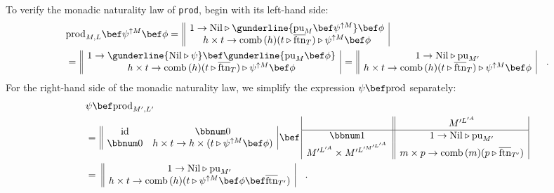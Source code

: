 To verify the monadic naturality law of \lstinline!prod!, begin with
its left-hand side:
\begin{align*}
 & \text{prod}_{M,L}\bef\psi^{\uparrow M}\bef\phi=\,\begin{array}{||c|}
1\rightarrow\text{Nil}\triangleright\gunderline{\text{pu}_{M}\bef\psi^{\uparrow M}}\bef\phi\\
h\times t\rightarrow\text{comb}\,(h)(t\triangleright\overline{\text{ftn}}_{T})\triangleright\psi^{\uparrow M}\bef\phi
\end{array}\\
 & =\,\begin{array}{||c|}
1\rightarrow\gunderline{\text{Nil}\triangleright\psi}\bef\gunderline{\text{pu}_{M}\bef\phi}\\
h\times t\rightarrow\text{comb}\,(h)(t\triangleright\overline{\text{ftn}}_{T})\triangleright\psi^{\uparrow M}\bef\phi
\end{array}\,=\,\begin{array}{||c|}
1\rightarrow\text{Nil}\triangleright\text{pu}_{M^{\prime}}\\
h\times t\rightarrow\text{comb}\,(h)(t\triangleright\overline{\text{ftn}}_{T})\triangleright\psi^{\uparrow M}\bef\phi
\end{array}\quad.
\end{align*}
For the right-hand side of the monadic naturality law, we simplify
the expression $\psi\bef\text{prod}$ separately:
\begin{align*}
 & \psi\bef\text{prod}_{M^{\prime},L^{\prime}}\\
 & =\,\begin{array}{||cc|}
\text{id} & \bbnum 0\\
\bbnum 0 & h\times t\rightarrow h\times(t\triangleright\psi^{\uparrow M}\bef\phi)
\end{array}\,\bef\,\begin{array}{|c||c|}
 & M^{\prime L^{\prime A}}\\
\hline \bbnum 1 & 1\rightarrow\text{Nil}\triangleright\text{pu}_{M^{\prime}}\\
M^{\prime L^{\prime A}}\times M^{\prime L^{\prime M^{\prime L^{\prime A}}}} & m\times p\rightarrow\text{comb}\,(m)(p\triangleright\overline{\text{ftn}}_{T^{\prime}})
\end{array}\\
 & =\,\,\begin{array}{||c|}
1\rightarrow\text{Nil}\triangleright\text{pu}_{M^{\prime}}\\
h\times t\rightarrow\text{comb}\,(h)(t\triangleright\psi^{\uparrow M}\bef\phi\bef\overline{\text{ftn}}_{T^{\prime}})
\end{array}\quad.
\end{align*}
